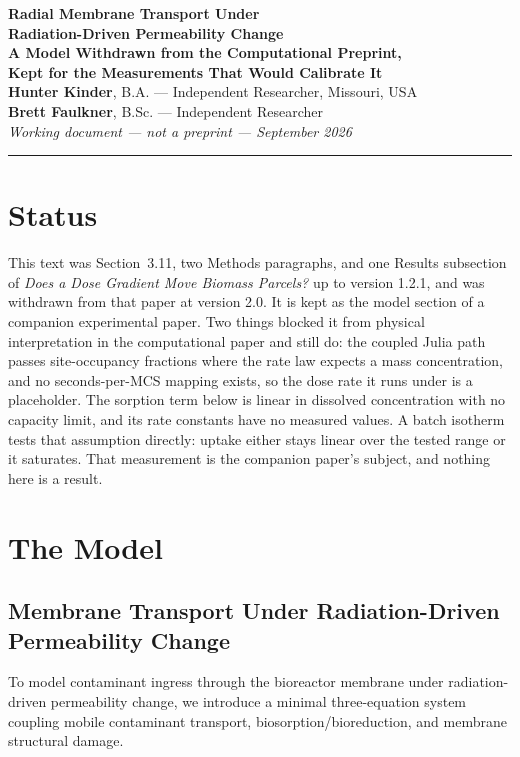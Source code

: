 \documentclass[11pt]{article}
\begin{document}
\begin{center}
  {\LARGE\bfseries Radial Membrane Transport Under\\ Radiation-Driven Permeability Change}\\[10pt]
  {\large\bfseries A Model Withdrawn from the Computational Preprint,\\ Kept for the Measurements That Would Calibrate It}\\[14pt]
  {\normalsize
    \textbf{Hunter Kinder}, B.A. --- Independent Researcher, Missouri, USA\\[2pt]
    \textbf{Brett Faulkner}, B.Sc. --- Independent Researcher\\[10pt]
  }
  {\small
    \textit{Working document --- not a preprint --- September 2026}
  }
\end{center}
\vspace{4pt}
\noindent\rule{\linewidth}{0.5pt}

\section*{Status}

This text was Section~3.11, two Methods paragraphs, and one Results subsection of
\emph{Does a Dose Gradient Move Biomass Parcels?} up to version 1.2.1, and was withdrawn from
that paper at version 2.0. It is kept as the model section of a companion experimental paper.
Two things blocked it from physical interpretation in the computational paper and still do: the
coupled Julia path passes site-occupancy fractions where the rate law expects a mass
concentration, and no seconds-per-MCS mapping exists, so the dose rate it runs under is a
placeholder. The sorption term below is linear in dissolved concentration with no capacity
limit, and its rate constants have no measured values. A batch isotherm tests that assumption
directly: uptake either stays linear over the tested range or it saturates. That measurement is
the companion paper's subject, and nothing here is a result.

\section{The Model}
\subsection{Membrane Transport Under Radiation-Driven Permeability Change}
\label{sec:radiodialysis}

To model contaminant ingress through the bioreactor membrane under radiation-driven
permeability change, we introduce a minimal three-equation system coupling mobile
contaminant transport, biosorption/bioreduction, and membrane structural damage.
\end{document}
